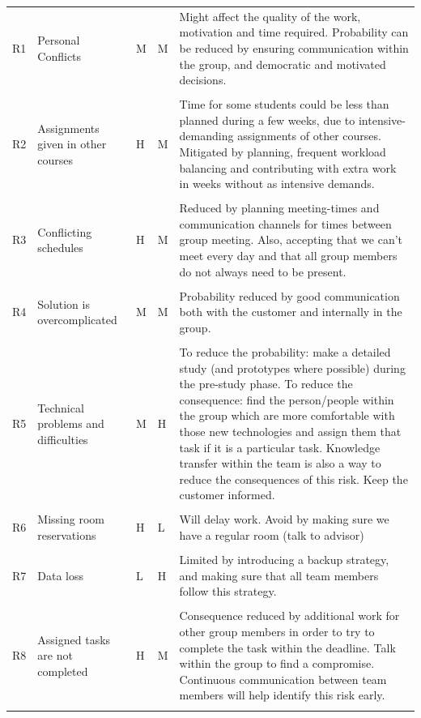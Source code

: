 \documentclass[11pt,a4paper,titlepage,oneside]{report}
\begin{document}
\begin{longtable}{p{0.7cm} p{2.5cm} p{0.7cm} p{0.7cm} p{6.5cm} }
  \hline
R1 & Personal Conflicts & M & M & Might affect the quality of the work, motivation and time required. Probability can be reduced by ensuring communication within the group, and democratic and motivated decisions. \\ \\ \hline
R2 & Assignments given in other courses & H & M & Time for some students could be less than planned during a few weeks, due to intensive-demanding assignments of other courses. Mitigated by planning, frequent workload balancing and contributing with extra work in weeks without as intensive demands. \\ \\ \hline
R3 & Conflicting schedules & H & M & Reduced by planning meeting-times and communication channels for times between group meeting. Also, accepting that we can't meet every day and that all group members do not always need to be present. \\ \\ \hline
R4 & Solution is overcomplicated & M & M & Probability reduced by good communication both with the customer and internally in the group. \\ \\ \hline
R5 & Technical problems and difficulties & M & H & To reduce the probability: make a detailed study (and prototypes where possible) during the pre-study phase. To reduce the consequence: find the person/people within the group which are more comfortable with those new technologies and assign them that task if it is a particular task. Knowledge transfer within the team is also a way to reduce the consequences of this risk. Keep the customer informed. \\ \\ \hline
R6 & Missing room reservations & H & L & Will delay work. Avoid by making sure we have a regular room (talk to advisor) \\ \\ \hline
R7 & Data loss & L & H & Limited by introducing a backup strategy, and making sure that all team members follow this strategy. \\ \\ \hline
R8 & Assigned tasks are not completed & H & M & Consequence reduced by additional work for other group members in order to try to complete the task within the deadline. Talk within the group to find a compromise. Continuous communication between team members will help identify this risk early.  \\ \\ \hline

\end{longtable}
\end{document}
